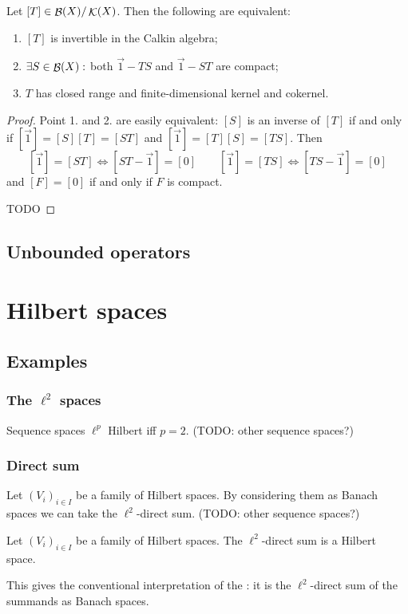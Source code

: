 \begin{proposition}
Let $[T]\in\mathop{\mathcal{B}}(X)/\mathop{\mathcal{K}}(X)$. Then the following are equivalent:
\begin{enumerate}
\item $[T]$ is invertible in the Calkin algebra;
\item $\exists S\in\mathop{\mathcal{B}}(X):$ both $\vec{1}-TS$ and $\vec{1}-ST$ are compact;
\item $T$ has closed range and finite-dimensional kernel and cokernel. 
\end{enumerate}
\end{proposition}
\begin{proof}
Point 1. and 2. are easily equivalent: $[S]$ is an inverse of $[T]$ if and only if $[\vec{1}] = [S][T] = [ST]$ and $[\vec{1}] = [T][S] = [TS]$. Then
\[ [\vec{1}] = [ST] \iff [ST - \vec{1}] = [0] \qquad [\vec{1}] = [TS] \iff [TS - \vec{1}] = [0] \]
and $[F]=[0]$ if and only if $F$ is compact.

TODO
\end{proof}

\section{Unbounded operators}




\chapter{Hilbert spaces}

\section{Examples}
\subsection{The $\ell^2$ spaces}
Sequence spaces $\ell^p$ Hilbert iff $p=2$. (TODO: other sequence spaces?)

\subsection{Direct sum}
Let $(V_i)_{i\in I}$ be a family of Hilbert spaces. By considering them as Banach spaces we can take the $\ell^2$-direct sum. (TODO: other sequence spaces?)
\begin{proposition}
Let $(V_i)_{i\in I}$ be a family of Hilbert spaces. The $\ell^2$-direct sum is a Hilbert space.
\end{proposition}
This gives the conventional interpretation of the : it is the $\ell^2$-direct sum of the summands as Banach spaces.


